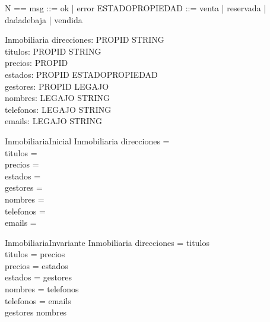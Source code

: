 \begin{zed}
\also
N == \nat
\also
msg ::= ok | error
\also
ESTADOPROPIEDAD ::= venta | reservada | dadadebaja | vendida
\end{zed}

\begin{schema}{Inmobiliaria}
direcciones: PROPID \pfun STRING \\
titulos: PROPID \pfun STRING \\
precios: PROPID \pfun \nat \\
estados: PROPID \pfun ESTADOPROPIEDAD \\
gestores: PROPID \pfun LEGAJO \\

nombres: LEGAJO \pfun STRING \\
telefonos: LEGAJO \pfun STRING \\
emails: LEGAJO \pfun STRING \\
\end{schema}

\begin{schema}{InmobiliariaInicial}
Inmobiliaria
\where
direcciones =  \emptyset  \\
titulos =  \emptyset  \\
precios =  \emptyset  \\
estados =  \emptyset  \\
gestores =  \emptyset  \\

nombres =  \emptyset  \\
telefonos =  \emptyset  \\
emails =  \emptyset  \\
\end{schema}

\begin{schema}{InmobiliariaInvariante}
Inmobiliaria
\where
\dom direcciones = \dom titulos \\
\dom titulos = \dom precios \\
\dom precios = \dom estados \\
\dom estados = \dom gestores \\

\dom nombres = \dom telefonos \\
\dom telefonos = \dom emails \\

\ran gestores \subseteq \dom nombres \\
\end{schema}

